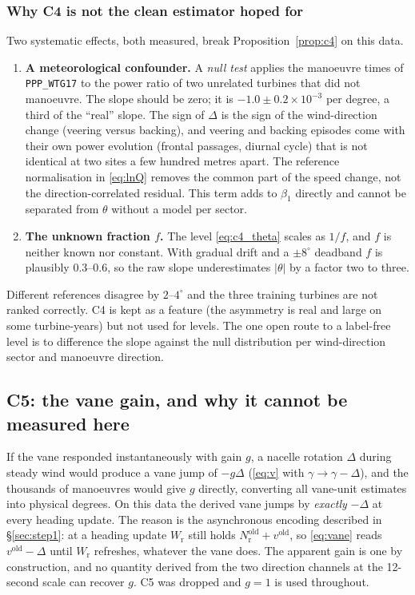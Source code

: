 \documentclass[11pt,a4paper]{article}
\theoremstyle{remark}
\newcommand{\dg}{^{\circ}}
\newcommand{\code}[1]{\texttt{#1}}
\newcommand{\Wr}{W_{\mathrm{r}}}
\newcommand{\Nr}{N_{\mathrm{r}}}
\begin{document}
\subsubsection{Why C4 is not the clean estimator hoped for}\label{sec:c4_fail}
Two systematic effects, both measured, break Proposition~\ref{prop:c4} on this
data.
\begin{enumerate}
\item \textbf{A meteorological confounder.} A \emph{null test} applies the
      manoeuvre times of \code{PPP\_WTG17} to the power ratio of two unrelated
      turbines that did not manoeuvre. The slope should be zero; it is
      $-1.0\pm0.2\times10^{-3}$ per degree, a third of the ``real'' slope. The
      sign of $\Delta$ is the sign of the wind-direction change (veering versus
      backing), and veering and backing episodes come with their own power
      evolution (frontal passages, diurnal cycle) that is not identical at two
      sites a few hundred metres apart. The reference normalisation in
      \eqref{eq:lnQ} removes the common part of the speed change, not the
      direction-correlated residual. This term adds to $\beta_1$ directly and
      cannot be separated from $\theta$ without a model per sector.
\item \textbf{The unknown fraction $f$.} The level \eqref{eq:c4_theta} scales
      as $1/f$, and $f$ is neither known nor constant. With gradual drift and a
      $\pm8\dg$ deadband $f$ is plausibly $0.3$--$0.6$, so the raw slope
      underestimates $|\theta|$ by a factor two to three.
\end{enumerate}
Different references disagree by $2$--$4\dg$ and the three training turbines are
not ranked correctly. C4 is kept as a feature (the asymmetry is real and large
on some turbine-years) but not used for levels. The one open route to a
label-free level is to difference the slope against the null distribution per
wind-direction sector and manoeuvre direction.

\subsection{C5: the vane gain, and why it cannot be measured here}\label{sec:c5}
If the vane responded instantaneously with gain $g$, a nacelle rotation $\Delta$
during steady wind would produce a vane jump of $-g\Delta$ (\eqref{eq:v} with
$\gamma\to\gamma-\Delta$), and the thousands of manoeuvres would give $g$
directly, converting all vane-unit estimates into physical degrees. On this data
the derived vane jumps by \emph{exactly} $-\Delta$ at every heading update. The
reason is the asynchronous encoding described in \S\ref{sec:step1}: at a
heading update $\Wr$ still holds $\Nr^{\mathrm{old}}+v^{\mathrm{old}}$, so
\eqref{eq:vane} reads $v^{\mathrm{old}}-\Delta$ until $\Wr$ refreshes, whatever
the vane does. The apparent gain is one by construction, and no quantity derived
from the two direction channels at the 12-second scale can recover $g$. C5 was
dropped and $g=1$ is used throughout.
\end{document}
